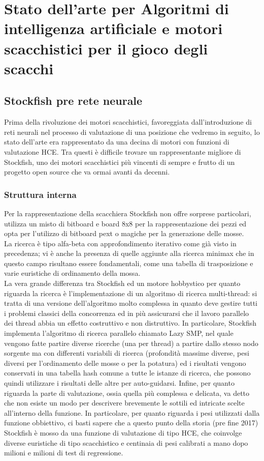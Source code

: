 \chapter{Stato dell'arte per Algoritmi di intelligenza artificiale e motori scacchistici  per il gioco degli scacchi} %
%

\section{Stockfish pre rete neurale }
Prima della rivoluzione dei motori scacchistici, favoreggiata dall'introduzione di reti neurali nel processo di valutazione di una posizione che vedremo in seguito, lo stato dell'arte era rappresentato
da una decina di motori con funzioni di valutazione HCE. Tra questi è difficile trovare un rappresentante migliore di Stockfish, uno dei motori scacchistici più vincenti di sempre e frutto di un progetto
open source che va ormai avanti da decenni.
\subsection{Struttura interna}
Per la rappresentazione della scacchiera Stockfish non offre sorprese particolari, utilizza un misto di bitboard e board 8x8 per la rappresentazione dei pezzi ed opta per l'utilizzo di bitboard pext
o magiche per la generazione delle mosse.\\La ricerca è tipo alfa-beta con approfondimento iterativo come già visto in precedenza; vi è anche la presenza di quelle 
aggiunte alla ricerca minimax che in questo campo risultano essere fondamentali, come una tabella di trasposizione e varie euristiche di ordinamento della mossa.\\La vera grande differenza
tra Stockfish ed un motore hobbystico per quanto riguarda la ricerca è l'implementazione di un algoritmo di ricerca multi-thread: si tratta di una versione dell'algoritmo molto complessa in quanto deve
gestire tutti i problemi classici della concorrenza ed in più assicurarsi che il lavoro parallelo dei thread abbia un effetto costruttivo e non distruttivo. In particolare, Stockfish implementa l'algoritmo di 
ricerca parallelo chiamato Lazy SMP, nel quale vengono fatte partire diverse ricerche (una per thread) a partire dallo stesso nodo sorgente ma con differenti variabili di ricerca (profondità massime diverse, pesi 
diversi per l'ordinamento delle mosse o per la potatura) ed i risultati vengono conservati in una tabella hash comune a tutte le istanze di ricerca, che possono quindi utilizzare i risultati delle altre per 
auto-guidarsi. Infine, per quanto riguarda la parte di valutazione, ossia quella più complessa e delicata, va detto che non esiste un modo per descrivere brevemente le sottili ed intricate scelte all'interno 
della funzione. In particolare, per quanto riguarda i pesi utilizzati dalla funzione obbiettivo, ci basti sapere che a questo punto della storia (pre fine 2017) Stockfish è mosso da una funzione di valutazione 
di tipo HCE, che coinvolge diverse euristiche di tipo scacchistico e centinaia di pesi calibrati a mano dopo milioni e milioni di test di regressione.


